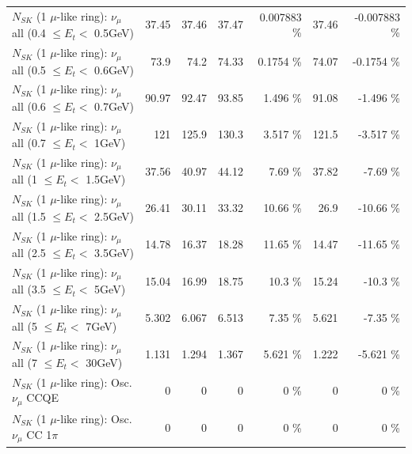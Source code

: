 \begin{table}
\begin{tabular}{| l | r | r | r  r | r  r |}
       $N_{SK}$ (1 $\mu$-like ring): $\nu_{\mu}$ all (0.4 $\leq E_{t} <$ 0.5GeV) &           37.45 &           37.46 &           37.47 & 0.007883 \%  &           37.46 & -0.007883 \%  \\ 
       $N_{SK}$ (1 $\mu$-like ring): $\nu_{\mu}$ all (0.5 $\leq E_{t} <$ 0.6GeV) &            73.9 &            74.2 &           74.33 &   0.1754 \%  &           74.07 &  -0.1754 \%  \\ 
       $N_{SK}$ (1 $\mu$-like ring): $\nu_{\mu}$ all (0.6 $\leq E_{t} <$ 0.7GeV) &           90.97 &           92.47 &           93.85 &    1.496 \%  &           91.08 &   -1.496 \%  \\ 
         $N_{SK}$ (1 $\mu$-like ring): $\nu_{\mu}$ all (0.7 $\leq E_{t} <$ 1GeV) &             121 &           125.9 &           130.3 &    3.517 \%  &           121.5 &   -3.517 \%  \\ 
         $N_{SK}$ (1 $\mu$-like ring): $\nu_{\mu}$ all (1 $\leq E_{t} <$ 1.5GeV) &           37.56 &           40.97 &           44.12 &     7.69 \%  &           37.82 &    -7.69 \%  \\ 
       $N_{SK}$ (1 $\mu$-like ring): $\nu_{\mu}$ all (1.5 $\leq E_{t} <$ 2.5GeV) &           26.41 &           30.11 &           33.32 &    10.66 \%  &            26.9 &   -10.66 \%  \\ 
       $N_{SK}$ (1 $\mu$-like ring): $\nu_{\mu}$ all (2.5 $\leq E_{t} <$ 3.5GeV) &           14.78 &           16.37 &           18.28 &    11.65 \%  &           14.47 &   -11.65 \%  \\ 
         $N_{SK}$ (1 $\mu$-like ring): $\nu_{\mu}$ all (3.5 $\leq E_{t} <$ 5GeV) &           15.04 &           16.99 &           18.75 &     10.3 \%  &           15.24 &    -10.3 \%  \\ 
           $N_{SK}$ (1 $\mu$-like ring): $\nu_{\mu}$ all (5 $\leq E_{t} <$ 7GeV) &           5.302 &           6.067 &           6.513 &     7.35 \%  &           5.621 &    -7.35 \%  \\ 
          $N_{SK}$ (1 $\mu$-like ring): $\nu_{\mu}$ all (7 $\leq E_{t} <$ 30GeV) &           1.131 &           1.294 &           1.367 &    5.621 \%  &           1.222 &   -5.621 \%  \\ 
\hline
\hline
                               $N_{SK}$ (1 $\mu$-like ring): Osc. $\nu_\mu$ CCQE &               0 &               0 &               0 &        0 \%  &               0 &        0 \%  \\ 
                          $N_{SK}$ (1 $\mu$-like ring): Osc. $\nu_\mu$ CC 1$\pi$ &               0 &               0 &               0 &        0 \%  &               0 &        0 \%  \\ 

\end{tabular}
\end{table}
